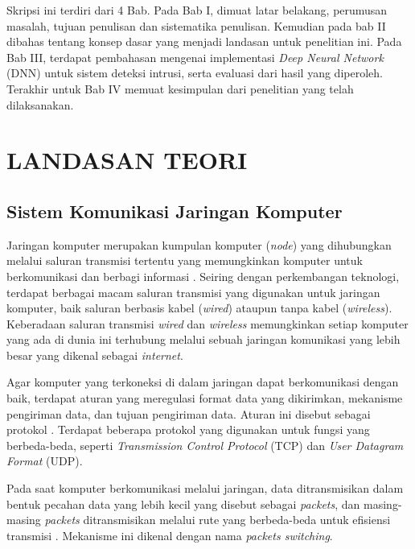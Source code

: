 \documentclass[a4paper,12pt]{report}
\begin{document}
Skripsi ini terdiri dari 4 Bab. Pada Bab I, dimuat latar belakang, perumusan masalah, tujuan penulisan dan sistematika penulisan. Kemudian pada bab II dibahas tentang konsep dasar yang menjadi landasan untuk penelitian ini. Pada Bab III, terdapat pembahasan mengenai implementasi \textit{Deep Neural Network} (DNN) untuk sistem deteksi intrusi, serta evaluasi dari hasil yang diperoleh. Terakhir untuk Bab IV memuat kesimpulan dari penelitian yang telah dilaksanakan.

\chapter{LANDASAN TEORI}
\thispagestyle{empty}

\section{Sistem Komunikasi Jaringan Komputer}
Jaringan komputer merupakan kumpulan komputer (\textit{node}) yang dihubungkan melalui saluran transmisi tertentu yang memungkinkan komputer untuk berkomunikasi dan berbagi informasi \cite{robertazziIntroductionComputerNetworking2017}. Seiring dengan perkembangan teknologi, terdapat berbagai macam saluran transmisi yang digunakan untuk jaringan komputer, baik saluran berbasis kabel (\textit{wired}) ataupun tanpa kabel (\textit{wireless}). Keberadaan saluran transmisi \textit{wired} dan \textit{wireless} memungkinkan setiap komputer yang ada di dunia ini terhubung melalui sebuah jaringan komunikasi yang lebih besar yang dikenal sebagai \textit{internet}.

Agar komputer yang terkoneksi di dalam jaringan dapat berkomunikasi dengan baik, terdapat aturan yang meregulasi format data yang dikirimkan, mekanisme pengiriman data, dan tujuan pengiriman data. Aturan ini disebut sebagai protokol \cite{tanenbaumComputerNetworks2011}. Terdapat beberapa protokol yang digunakan untuk fungsi yang berbeda-beda, seperti \textit{Transmission Control Protocol} (TCP) dan \textit{User Datagram Format} (UDP). 

Pada saat komputer berkomunikasi melalui jaringan, data ditransmisikan dalam bentuk pecahan data yang lebih kecil yang disebut sebagai \textit{packets}, dan masing-masing \textit{packets} ditransmisikan melalui rute yang berbeda-beda untuk efisiensi transmisi \cite{tanenbaumComputerNetworks2011}\cite{robertazziIntroductionComputerNetworking2017}. Mekanisme ini dikenal dengan nama \textit{packets switching}.
\end{document}
